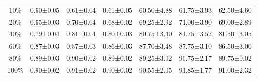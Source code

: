 \documentclass[conference]{IEEEtran}
\begin{document}
\begin{table}[t]
{\begin{tabular}{c|ccc|ccc}
10\%                                                                & {\color[HTML]{1E1E1E} 0.60±0.05} & {\color[HTML]{1E1E1E} 0.61±0.04} & {\color[HTML]{1E1E1E} 0.61±0.05} & {\color[HTML]{1E1E1E} 60.50±4.88} & {\color[HTML]{1E1E1E} 61.75±3.93} & {\color[HTML]{1E1E1E} 62.50±4.60} \\
20\%                                                                & {\color[HTML]{1E1E1E} 0.65±0.03} & {\color[HTML]{1E1E1E} 0.70±0.04} & {\color[HTML]{1E1E1E} 0.68±0.02} & {\color[HTML]{1E1E1E} 69.25±2.92} & {\color[HTML]{1E1E1E} 71.00±3.90} & {\color[HTML]{1E1E1E} 69.00±2.89} \\
40\%                                                                & {\color[HTML]{1E1E1E} 0.79±0.04} & {\color[HTML]{1E1E1E} 0.81±0.04} & {\color[HTML]{1E1E1E} 0.80±0.03} & {\color[HTML]{1E1E1E} 80.75±3.40} & {\color[HTML]{1E1E1E} 81.75±3.52} & {\color[HTML]{1E1E1E} 81.50±3.05} \\
60\%                                                                & {\color[HTML]{1E1E1E} 0.87±0.03} & {\color[HTML]{1E1E1E} 0.87±0.03} & {\color[HTML]{1E1E1E} 0.86±0.03} & {\color[HTML]{1E1E1E} 87.70±3.48} & {\color[HTML]{1E1E1E} 87.75±3.10} & {\color[HTML]{1E1E1E} 86.50±3.00} \\
80\%                                                                & {\color[HTML]{1E1E1E} 0.89±0.03} & {\color[HTML]{1E1E1E} 0.90±0.02} & {\color[HTML]{1E1E1E} 0.89±0.02} & {\color[HTML]{1E1E1E} 89.25±3.02} & {\color[HTML]{1E1E1E} 90.75±2.17} & {\color[HTML]{1E1E1E} 89.75±0.02} \\
100\%                                                               & {\color[HTML]{1E1E1E} 0.90±0.02} & {\color[HTML]{1E1E1E} 0.91±0.02} & {\color[HTML]{1E1E1E} 0.90±0.02} & {\color[HTML]{1E1E1E} 90.55±2.05} & {\color[HTML]{1E1E1E} 91.85±1.77} & {\color[HTML]{1E1E1E} 91.00±2.32} \\ \hline
\end{tabular}}
\vspace{-3mm}
\end{table} \begin{table}[t]
\caption{Performance measure of proposed method MPCS (ResNet-50 encoder) on Breast Cancer Cell Dataset}
\end{table}
\end{document}
